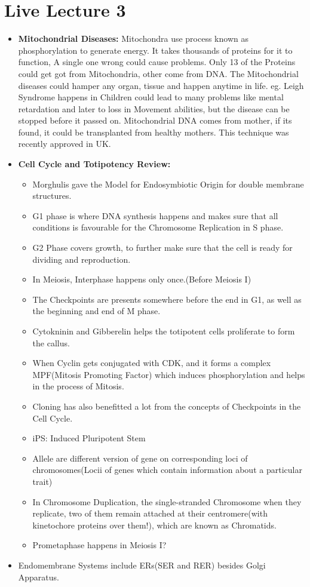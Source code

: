 \documentclass{article}
\begin{document}
\section{Live Lecture 3}
  \begin{itemize}
    \item \textbf{Mitochondrial Diseases:} Mitochondra use process known as phosphorylation to generate energy. It takes thousands of proteins for it to function, A single one wrong could cause problems. Only 13 of the Proteins could get got from Mitochondria, other come from DNA. The Mitochondrial diseases could hamper any organ, tissue and happen anytime in life. eg. Leigh Syndrome happens in Children could lead to many problems like mental retardation and later to loss in Movement abilities, but the disease can be stopped before it passed on. Mitochondrial DNA comes from mother, if its found, it could be transplanted from healthy mothers. This technique was recently approved in UK.
    \item \textbf{Cell Cycle and Totipotency Review:}
    \begin{itemize}
      \item Morghulis gave the Model for Endosymbiotic Origin for double membrane structures.
      \item G1 phase is where DNA synthesis happens and makes sure that all conditions is favourable for the Chromosome Replication in S phase.
      \item G2 Phase covers growth, to further make sure that the cell is ready for dividing and reproduction.
      \item In Meiosis, Interphase happens only once.(Before Meiosis I)
      \item The Checkpoints are presents somewhere before the end in G1, as well as the beginning and end of M phase.
      \item Cytokninin and Gibberelin helps the totipotent cells proliferate to form the callus.
      \item When Cyclin gets conjugated with CDK, and it forms a complex MPF(Mitosis Promoting Factor) which induces phosphorylation and helps in the process of Mitosis.
      \item Cloning has also benefitted a lot from the concepts of Checkpoints in the Cell Cycle.
      \item iPS: Induced Pluripotent Stem
      \item Allele are different version of gene on corresponding loci of chromosomes(Locii of genes which contain information about a particular trait)
      \item In Chromosome Duplication, the single-stranded Chromosome when they replicate, two of them remain attached at their centromere(with kinetochore proteins over them!), which are known as Chromatids.
      \item Prometaphase happens in Meiosis I?
    \end{itemize}
    \item Endomembrane Systems include ERs(SER and RER) besides Golgi Apparatus.
  \end{itemize}
\end{document}
